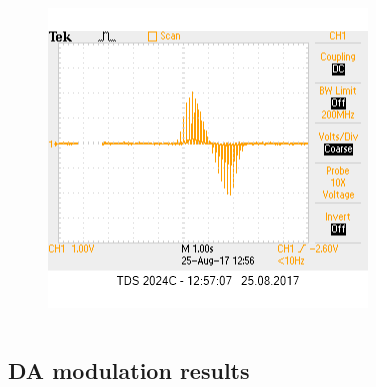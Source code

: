 \documentclass[12pt, aspectratio=169]{beamer}
\begin{document}
\begin{frame}
\begin{columns}[c]
\begin{figure}
\includegraphics[width=1\linewidth]{inh_output_single}
\end{figure}
\end{columns}
\end{frame}

\subsection{DA modulation results}
\end{document}
